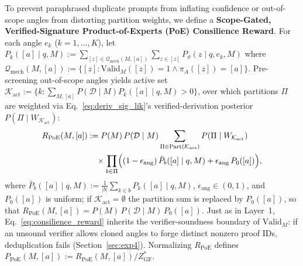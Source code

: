 \documentclass[11pt,a4paper]{article}
\theoremstyle{definition}
\theoremstyle{remark}
\newcommand{\Valid}{\mathrm{Valid}}
\begin{document}
To prevent paraphrased duplicate prompts from inflating confidence or out-of-scope angles from distorting partition weights, we define a \textbf{Scope-Gated, Verified-Signature Product-of-Experts (PoE) Consilience Reward}. For each angle $e_k$ ($k = 1, \dots, K$), let $P_k([a] \mid q, M) := \sum_{[z] \in \mathcal{Q}_{\mathrm{mech}}(M,[a])} \sum_{z \in [z]} P_{\vartheta}(z \mid q, e_k, M)$ where $\mathcal{Q}_{\mathrm{mech}}(M, [a]) := \{[z] : \Valid_M([z]) = 1 \land \pi_A([z]) = [a]\}$. Pre-screening out-of-scope angles yields active set $\mathcal{K}_{\mathrm{act}} := \{k : \sum_{M, [a]} P(\mathcal{D} \mid M) P_k([a] \mid q, M) > 0\}$, over which partitions $\Pi$ are weighted via Eq.~\eqref{eq:deriv_sig_lik}'s verified-derivation posterior $P(\Pi \mid W_{\mathcal{K}_{\mathrm{act}}})$:
\begin{equation}
  \begin{aligned}
    R_{\mathrm{PoE}}(M, [a])
    &:= P(M) \, P(\mathcal{D} \mid M) \sum_{\Pi \in \mathrm{Part}(\mathcal{K}_{\mathrm{act}})} P(\Pi \mid W_{\mathcal{K}_{\mathrm{act}}}) \\
    &\quad \times \prod_{b \in \Pi} \Bigl( (1 - \epsilon_{\mathrm{ang}}) \, \bar{P}_b([a] \mid q, M) + \epsilon_{\mathrm{ang}} \, P_0([a]) \Bigr),
  \end{aligned}
  \label{eq:consilience_reward}
\end{equation}
where $\bar{P}_b([a] \mid q, M) := \frac{1}{|b|} \sum_{k \in b} P_k([a] \mid q, M)$, $\epsilon_{\mathrm{ang}} \in (0, 1)$, and $P_0([a])$ is uniform; if $\mathcal{K}_{\mathrm{act}} = \emptyset$ the partition sum is replaced by $P_0([a])$, so that $R_{\mathrm{PoE}}(M, [a]) = P(M)\,P(\mathcal{D} \mid M)\,P_0([a])$. Just as in Layer~1, Eq.~\eqref{eq:consilience_reward} inherits the verifier-soundness boundary of $\Valid_M$: if an unsound verifier allows cloned angles to forge distinct nonzero proof IDs, deduplication fails (Section~\ref{sec:exp4}). Normalizing $R_{\mathrm{PoE}}$ defines $P_{\mathrm{PoE}}(M, [a]) := R_{\mathrm{PoE}}(M, [a]) / Z_{\mathrm{GF}}^*$.
\end{document}
